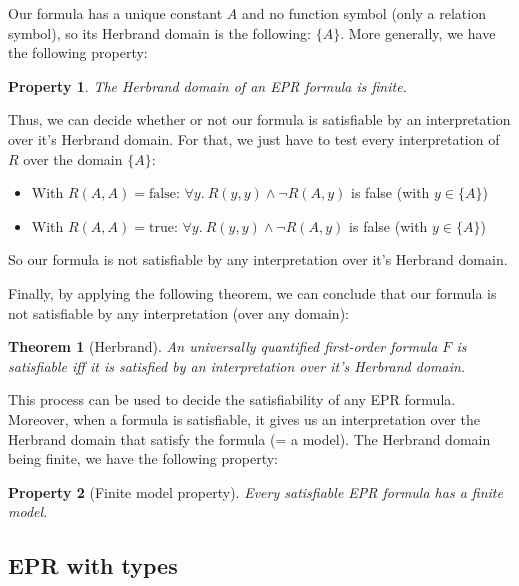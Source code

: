 \documentclass[11pt,a4paper,oldfontcommands,openany]{memoir}
\newtheorem*{theorem}{Theorem}
\newtheorem*{property}{Property}
\begin{document}
        Our formula has a unique constant \(A\) and no function symbol (only a relation symbol), so its Herbrand domain is the following:
        \( \{A\} \). More generally, we have the following property:
        
        \begin{property}
        The Herbrand domain of an EPR formula is finite.
        \end{property}

        Thus, we can decide whether or not our formula is satisfiable by an interpretation over it's Herbrand domain.
        For that, we just have to test every interpretation of \(R\) over the domain \( \{A\} \):

        \begin{itemize}
            \item With \(R(A,A)=\text{false}\): \(\forall y. \ R(y,y) \land \neg R(A,y)\) is false (with \( y \in \{A\} \))
            \item With \(R(A,A)=\text{true}\): \(\forall y. \ R(y,y) \land \neg R(A,y)\) is false (with \( y \in \{A\} \))
        \end{itemize}

        So our formula is not satisfiable by any interpretation over it's Herbrand domain.

        Finally, by applying the following theorem, we can conclude that our formula is not satisfiable by any interpretation (over any domain):
        \begin{theorem}[Herbrand]
            An universally quantified first-order formula \(F\) is satisfiable iff it is satisfied by an interpretation over it's Herbrand domain.
        \end{theorem}

        This process can be used to decide the satisfiability of any EPR formula. Moreover, when a formula is satisfiable,
        it gives us an interpretation over the Herbrand domain that satisfy the formula (= a model).
        The Herbrand domain being finite, we have the following property:

        \begin{property}[Finite model property]
            Every satisfiable EPR formula has a finite model.
        \end{property}

        \subsection{EPR with types}
\end{document}
